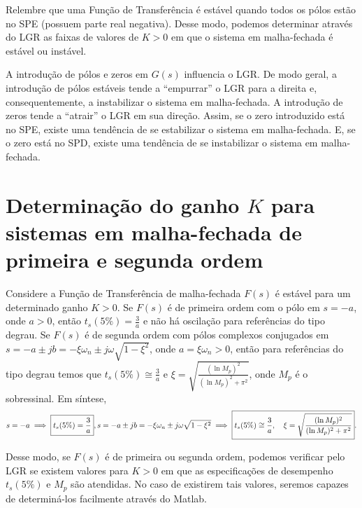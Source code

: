 \documentclass[
]{book}
\theoremstyle{definition}
\theoremstyle{definition}
\theoremstyle{definition}
\theoremstyle{remark}
\begin{document}
Relembre que uma Função de Transferência é estável quando todos os pólos estão no SPE (possuem parte real negativa). Desse modo, podemos determinar através do LGR as faixas de valores de \(K>0\) em que o sistema em malha-fechada é estável ou instável.

A introdução de pólos e zeros em \(G(s)\) influencia o LGR. De modo geral, a introdução de pólos estáveis tende a ``empurrar'' o LGR para a direita e, consequentemente, a instabilizar o sistema em malha-fechada. A introdução de zeros tende a ``atrair'' o LGR em sua direção. Assim, se o zero introduzido está no SPE, existe uma tendência de se estabilizar o sistema em malha-fechada. E, se o zero está no SPD, existe uma tendência de se instabilizar o sistema em malha-fechada.

\hypertarget{determinauxe7uxe3o-do-ganho-k-para-sistemas-em-malha-fechada-de-primeira-e-segunda-ordem}{%
\section{\texorpdfstring{Determinação do ganho \(K\) para sistemas em malha-fechada de primeira e segunda ordem}{Determinação do ganho K para sistemas em malha-fechada de primeira e segunda ordem}}\label{determinauxe7uxe3o-do-ganho-k-para-sistemas-em-malha-fechada-de-primeira-e-segunda-ordem}}

Considere a Função de Transferência de malha-fechada \(F(s)\) é estável para um determinado ganho \(K>0\). Se \(F(s)\) é de primeira ordem com o pólo em \(s = -a\), onde \(a > 0\), então \(t_s(5\%) = \frac{3}{a}\) e não há oscilação para referências do tipo degrau. Se \(F(s)\) é de segunda ordem com pólos complexos conjugados em \(s=-a \pm jb = -\xi\omega_n \pm j\omega\sqrt{1-\xi^2}\), onde \(a = \xi\omega_n >0\), então para referências do tipo degrau temos que \(t_s(5\%) \cong \frac{3}{a}\) e \(\xi = \sqrt{\frac{(\ln{M_p})^2}{(\ln{M_p})^2 + \pi^2}}\), onde \(M_p\) é o sobressinal. Em síntese,
\[
s = -a \implies \boxed{t_s(5\%) = \frac{3}{a}}, \\
s=-a \pm jb = -\xi\omega_n \pm j\omega\sqrt{1-\xi^2} \\
\implies \boxed{t_s(5\%) \cong \frac{3}{a}, \quad \xi = \sqrt{\frac{(\ln{M_p})^2}{(\ln{M_p})^2 + \pi^2}}}. \label{eq:eq81}
\]

Desse modo, se \(F(s)\) é de primeira ou segunda ordem, podemos verificar pelo LGR se existem valores para \(K>0\) em que as especificações de desempenho \(t_s(5\%)\) e \(M_p\) são atendidas. No caso de existirem tais valores, seremos capazes de determiná-los facilmente através do Matlab.
\end{document}
